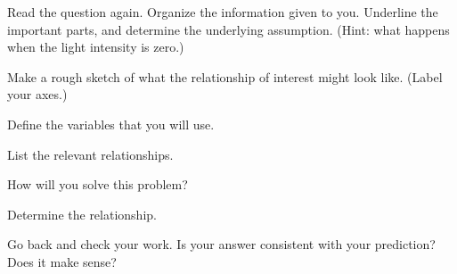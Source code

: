 \begin{problem}
      \begin{subproblem}
      \item Read the question again. Organize the information given to
        you. Underline the important parts, and determine the underlying
        assumption. (Hint: what happens when the light intensity is
        zero.)
        \vfill
      \item Make a rough sketch of what the relationship of interest
        might look like. (Label your axes.)
        \vfill
      \item Define the variables that you will use.
        \vspace{2em}
      \item List the relevant relationships.
        \vfill
      \item How will you solve this problem?
        \vfill
      \item Determine the relationship.
        \vfill
      \item Go back and check your work. Is your answer consistent
        with your prediction? Does it make sense?
      \end{subproblem}

\end{problem}

\postClass


